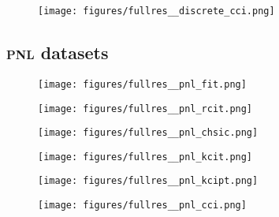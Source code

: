 \begin{figure}[!h]
\texttt{[image: figures/fullres\_\_discrete\_cci.png]}
\caption{}
\label{fig:result_discrete_cci}
\end{figure}

\FloatBarrier
\subsection{\textsc{pnl} datasets}

\begin{figure}[!h]
\texttt{[image: figures/fullres\_\_pnl\_fit.png]}
\caption{}
\label{fig:result_pnl_fit}
\end{figure}

\begin{figure}
\texttt{[image: figures/fullres\_\_pnl\_rcit.png]}
\caption{}
\label{fig:result_pnl_rcit}
\end{figure}

\begin{figure}[!h]
\texttt{[image: figures/fullres\_\_pnl\_chsic.png]}
\caption{}
\label{fig:result_pnl_chsic}
\end{figure}

\begin{figure}[!h]
\texttt{[image: figures/fullres\_\_pnl\_kcit.png]}
\caption{}
\label{fig:result_pnl_kcit}
\end{figure}

\begin{figure}[!h]
\texttt{[image: figures/fullres\_\_pnl\_kcipt.png]}
\caption{}
\label{fig:result_pnl_kcipt}
\end{figure}

\begin{figure}[!h]
\texttt{[image: figures/fullres\_\_pnl\_cci.png]}
\caption{}
\label{fig:result_pnl_cci}
\end{figure}
